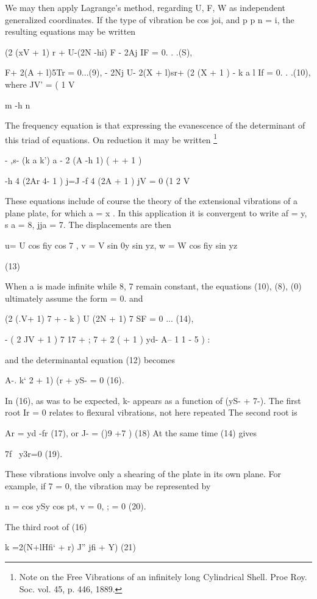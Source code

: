 We may then apply Lagrange’s method, regarding U, F, W as independent
generalized coordinates. If the type of vibration be cos joi, and p p n = i, the
resulting equations may be written

(2 (xV + 1) r + U-(2N -hi) F - 2Aj IF = 0. . .(S),

F+ 2(A + l)5Tr = 0...(9),
- 2Nj U- 2(X + l)sr+ (2 (X + 1 ) - k a l If = 0. . .(10), where JV' = ( 1 V

m -h n

The frequency equation is that expressing the evanescence of the determinant of
this triad of equations. On reduction it may be written
\footnote{Note on the Free Vibrations of an infinitely long Cylindrical Shell.
Proe Roy. Soc. vol. 45, p. 446, 1889.}


- ,s- (k a k') a - 2 (A -h 1) ( + + 1 )

-h 4 (2Ar 4- 1 ) j=J -f 4 (2A + 1 ) jV = 0 (1 2 V

These equations include of course the theory of the extensional vibrations of a
plane plate, for which a = x . In this application it is convergent to write
af = y, s a = 8, jja = 7. The displacements are then

u= U cos fiy cos 7 , v = V sin 0y sin yz, w = W cos fiy sin yz

(13)

When a is made infinite while 8, 7 remain
constant, the equations (10), (8), (0) ultimately assume the form = 0. and

(2 (.V+ 1) 7  + - k ) U (2N + 1) 7 SF = 0 ... (14),

- ( 2 JV + 1 ) 7 17 + ; 7 + 2 ( + 1 ) yd- A-- 1 1 - 5 ) :

and the determinantal equation (12) becomes

A-.  k‘  2 + 1) (r + yS- = 0 (16).

In (16), as was to be expected, k- appears as a function of (yS- + 7-).
The first root Ir = 0 relates to flexural vibrations, not here repeated
The second root is

Ar = yd -fr (17), or J- = ()9 +7 ) (18) At the same time (14) gives

7f ~y3r=0 (19).

These vibrations involve only a shearing of the plate in its own plane. For
example, if 7 = 0, the vibration may be represented by

n = cos ySy cos pt, v = 0, ; = 0 (20).

The third root of (16)

k =2(N+lHfi‘ + r) J'' jfi + Y) (21)

